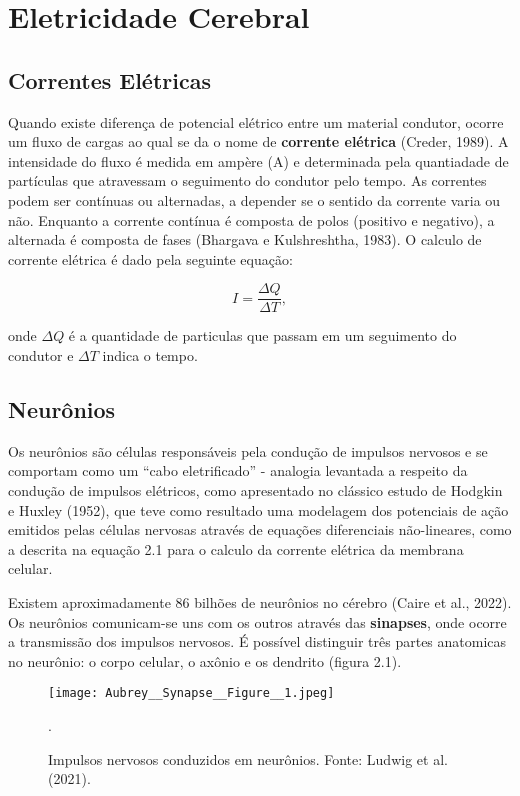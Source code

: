 \chapter{Eletricidade Cerebral}



\section{Correntes Elétricas}
Quando existe diferença de potencial elétrico entre um material condutor, 
ocorre um fluxo de cargas ao qual se da o nome de \textbf{corrente elétrica} (Creder, 1989).
A intensidade do fluxo é medida em ampère (A) e determinada pela quantiadade de partículas que atravessam o seguimento
do condutor pelo tempo. As correntes podem ser contínuas ou alternadas, a depender se o sentido da corrente varia ou não. Enquanto a corrente contínua 
é composta de polos (positivo e negativo), a alternada é composta de fases (Bhargava e Kulshreshtha, 1983). O calculo de corrente elétrica é 
dado pela seguinte equação:

\begin{equation}
    I = \frac{\Delta Q }{\Delta T},
\end{equation}

onde $\Delta Q$ é a quantidade de particulas que passam em um seguimento do condutor e $\Delta T$ indica o tempo. 

\section{Neurônios}
Os neurônios são células responsáveis pela condução de impulsos nervosos e se comportam como um “cabo eletrificado” - analogia
levantada a respeito da condução de impulsos elétricos, como apresentado no clássico estudo de Hodgkin e Huxley (1952), 
que teve como resultado uma modelagem dos potenciais de ação emitidos pelas células 
nervosas através de equações diferenciais não-lineares, como a descrita na equação 2.1 
para o calculo da corrente elétrica da membrana celular. 

Existem aproximadamente 86 bilhões de neurônios no cérebro (Caire et al., 2022). Os neurônios comunicam-se uns com os outros através das \textbf{sinapses}, onde ocorre a transmissão dos impulsos nervosos. 
É possível distinguir três partes anatomicas no neurônio: o corpo celular, o axônio e os dendrito (figura 2.1).

\begin{figure}[h]
    \centering
    \texttt{[image: Aubrey\_\_Synapse\_\_Figure\_\_1.jpeg]}
    \caption[Impulsos nervosos conduzidos em neurônios]{Impulsos nervosos conduzidos em neurônios. Fonte: Ludwig et al. (2021).}.\label{fig:potencial}
    \end{figure}


